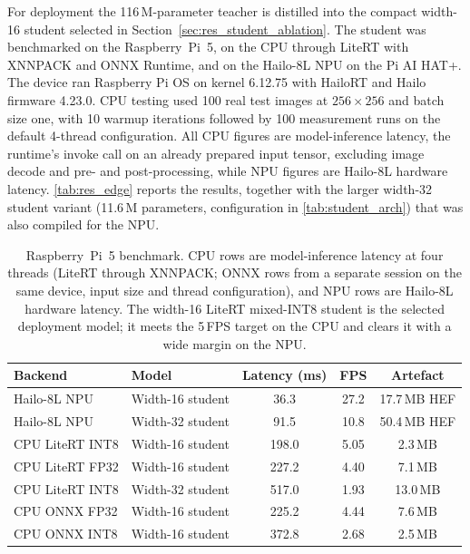 For deployment the 116\,M-parameter teacher is distilled into the compact width-16 student selected in Section~\ref{sec:res_student_ablation}. The student was benchmarked on the Raspberry~Pi~5, on the CPU through LiteRT with XNNPACK and ONNX Runtime, and on the Hailo-8L NPU on the Pi AI HAT+. The device ran Raspberry Pi OS on kernel 6.12.75 with HailoRT and Hailo firmware 4.23.0. CPU testing used 100 real test images at $256\times256$ and batch size one, with 10 warmup iterations followed by 100 measurement runs on the default 4-thread configuration. All CPU figures are model-inference latency, the runtime's invoke call on an already prepared input tensor, excluding image decode and pre- and post-processing, while NPU figures are Hailo-8L hardware latency. \autoref{tab:res_edge} reports the results, together with the larger width-32 student variant (11.6\,M parameters, configuration in \autoref{tab:student_arch}) that was also compiled for the NPU.

\begin{table}[!htbp]
\centering
\footnotesize
\begin{tabular}{llccc}
\hline
\textbf{Backend} & \textbf{Model} & \textbf{Latency (ms)} & \textbf{FPS} & \textbf{Artefact} \\
\hline
Hailo-8L NPU & Width-16 student & 36.3 & 27.2 & 17.7\,MB HEF \\
Hailo-8L NPU & Width-32 student & 91.5 & 10.8 & 50.4\,MB HEF \\
CPU LiteRT INT8 & Width-16 student & 198.0 & 5.05 & 2.3\,MB \\
CPU LiteRT FP32 & Width-16 student & 227.2 & 4.40 & 7.1\,MB \\
CPU LiteRT INT8 & Width-32 student & 517.0 & 1.93 & 13.0\,MB \\
CPU ONNX FP32 & Width-16 student & 225.2 & 4.44 & 7.6\,MB \\
CPU ONNX INT8 & Width-16 student & 372.8 & 2.68 & 2.5\,MB \\
\hline
\end{tabular}
\caption{Raspberry~Pi~5 benchmark. CPU rows are model-inference latency at four threads (LiteRT through XNNPACK; ONNX rows from a separate session on the same device, input size and thread configuration), and NPU rows are Hailo-8L hardware latency. The width-16 LiteRT mixed-INT8 student is the selected deployment model; it meets the 5\,FPS target on the CPU and clears it with a wide margin on the NPU.}
\label{tab:res_edge}
\end{table}

